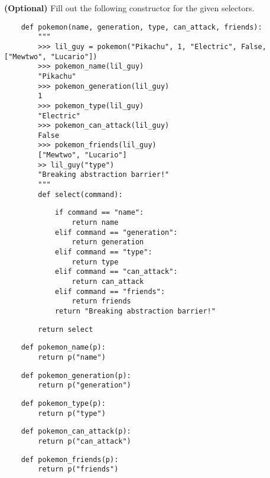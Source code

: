     \begin{blocksection}
    \question \textbf{(Optional)} Fill out the following constructor for the given
    selectors.
    
    \begin{lstlisting}
    def pokemon(name, generation, type, can_attack, friends):
        """
        >>> lil_guy = pokemon("Pikachu", 1, "Electric", False, ["Mewtwo", "Lucario"])
        >>> pokemon_name(lil_guy)
        "Pikachu"
        >>> pokemon_generation(lil_guy)
        1
        >>> pokemon_type(lil_guy)
        "Electric"
        >>> pokemon_can_attack(lil_guy)
        False
        >>> pokemon_friends(lil_guy)
        ["Mewtwo", "Lucario"]
        >> lil_guy("type")
        "Breaking abstraction barrier!"
        """
        def select(command):
    \end{lstlisting}
    \begin{solution}[1.8in]
    \begin{lstlisting}
            if command == "name":
                return name
            elif command == "generation":
                return generation
            elif command == "type":
                return type
            elif command == "can_attack":
                return can_attack
            elif command == "friends":
                return friends
            return "Breaking abstraction barrier!"
    \end{lstlisting}
    \end{solution}
    
    \begin{lstlisting}
        return select
    \end{lstlisting}
    
    \begin{lstlisting}
    def pokemon_name(p):
        return p("name")
    \end{lstlisting}
    
    \begin{lstlisting}
    def pokemon_generation(p):
        return p("generation")
    \end{lstlisting}
    
    \begin{lstlisting}
    def pokemon_type(p):
        return p("type")
    \end{lstlisting}

    \begin{lstlisting}
    def pokemon_can_attack(p):
        return p("can_attack")
    \end{lstlisting}

    \begin{lstlisting}
    def pokemon_friends(p):
        return p("friends")
    \end{lstlisting}
    
    \end{blocksection}
    
